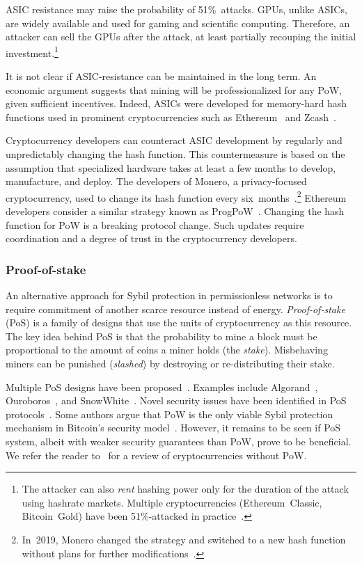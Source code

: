 ASIC resistance may raise the probability of 51\%~attacks.
GPUs, unlike ASICs, are widely available and used for gaming and scientific computing.
Therefore, an attacker can sell the GPUs after the attack, at least partially recouping the initial investment.\footnote{The attacker can also \textit{rent} hashing power only for the duration of the attack using hashrate markets. Multiple cryptocurrencies (Ethereum~Classic, Bitcoin~Gold) have been 51\%-attacked in practice~\cite{Xazax3102019}.}

It is not clear if ASIC-resistance can be maintained in the long term.
An economic argument suggests that mining will be professionalized for any PoW, given sufficient incentives.
Indeed, ASICs were developed for memory-hard hash functions used in prominent cryptocurrencies such as Ethereum~\cite{OLeary2018} and Zcash~\cite{Floyd2018}.

Cryptocurrency developers can counteract ASIC development by regularly and unpredictably changing the hash function.
This countermeasure is based on the assumption that specialized hardware takes at least a few months to develop, manufacture, and deploy.
The developers of Monero, a privacy-focused cryptocurrency, used to change its hash function every six~months~\cite{Kim2019}.\footnote{In~2019, Monero changed the strategy and switched to a new hash function without plans for further modifications~\cite{dEBRUYNE2019}.}
Ethereum developers consider a similar strategy known as ProgPoW~\cite{OLeary2019}.
Changing the hash function for PoW is a breaking protocol change.
Such updates require coordination and a degree of trust in the cryptocurrency developers.


\subsubsection*{Proof-of-stake}

An alternative approach for Sybil protection in permissionless networks is to require commitment of another scarce resource instead of energy.
\textit{Proof-of-stake} (PoS) is a family of designs that use the units of cryptocurrency as this resource.
The key idea behind PoS is that the probability to mine a block must be proportional to the amount of coins a miner holds (the \textit{stake}).
Misbehaving miners can be punished (\textit{slashed}) by destroying or re-distributing their stake.


Multiple PoS designs have been proposed~\cite{Bano2019}.
Examples include Algorand~\cite{Chen2019}, Ouroboros~\cite{Kiayias2017}, and SnowWhite~\cite{Bentov2016a}.
Novel security issues have been identified in PoS protocols~\cite{Fanti2019,Gazi2018,BrownCohen2019,Chitra2020}.
Some authors argue that PoW is the only viable Sybil protection mechanism in Bitcoin's security model~\cite{Andreev2014, Sztorc2015, Poelstra2015}.
However, it remains to be seen if PoS system, albeit with weaker security guarantees than PoW, prove to be beneficial.
We refer the reader to~\cite{Bentov2016} for a review of cryptocurrencies without PoW.


